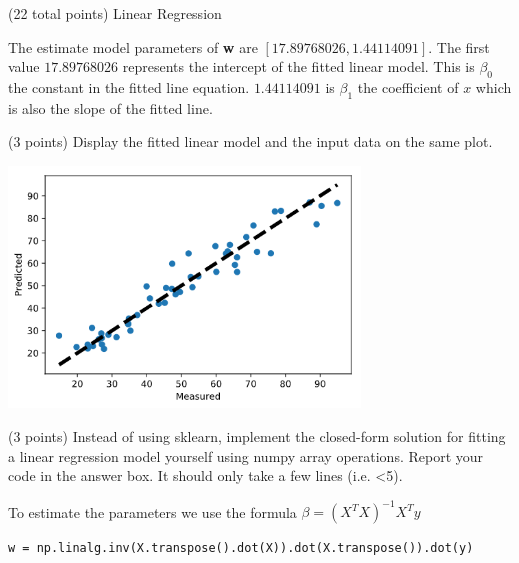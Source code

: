\documentclass[12pt]{article}
\begin{document}
\begin{question}{(22 total points) Linear Regression}
\begin{subquestion}
\begin{answerbox}{10em}
The estimate model parameters of \textbf{w} are $[17.89768026,  1.44114091]$. The first value $17.89768026$ represents the intercept of the fitted linear model. This is $\beta_{0}$ the constant in the fitted line equation. $1.44114091$ is $\beta_{1}$ the coefficient of $x$ which is also the slope of the fitted line.
\end{answerbox}



\end{subquestion}



%
%
\begin{subquestion}{(3 points) Display the fitted linear model and the input data on the same plot.
}


\begin{answerbox}{35em}
\begin{center}
\includegraphics[width=0.7\textwidth]{results/lin-reg-measured-vs-pred.png}
\end{center}
\end{answerbox}



\end{subquestion}



%
%
\begin{subquestion}{(3 points) Instead of using sklearn, implement the closed-form solution for fitting a linear regression model yourself using numpy array operations.  
Report your code in the answer box.
It should only take a few lines (i.e. <5).\\ 
}


\begin{answerbox}{20em}
To estimate the parameters we use the formula $\beta = (X^{T}X)^{-1}X^{T}y$
\begin{verbatim}
w = np.linalg.inv(X.transpose().dot(X)).dot(X.transpose()).dot(y)
\end{verbatim}
\end{answerbox}




\end{subquestion}
\end{question}
\end{document}
